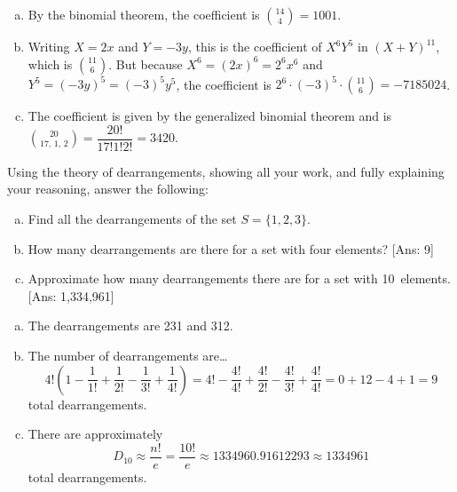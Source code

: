 \documentclass[11pt,letterpaper]{article}
\begin{document}
\sol 
\begin{enumerate}[(a)]
\item By the binomial theorem, the coefficient is $\binom{14}{4}= 1001$. 

\item Writing $X= 2x$ and $Y= -3y$, this is the coefficient of $X^6 Y^5$ in $(X + Y)^{11}$, which is $\binom{11}{6}$. But because $X^6= (2x)^6= 2^6 x^6$ and $Y^5= (-3y)^5= (-3)^5 y^5$, the coefficient is $2^6 \cdot (-3)^5 \cdot \binom{11}{6}= -7185024$. \pspace

\item The coefficient is given by the generalized binomial theorem and is $\binom{20}{17,\, 1,\, 2}= \dfrac{20!}{17! 1! 2!}= 3420$. 
\end{enumerate}



\newpage



 Using the theory of dearrangements, showing all your work, and fully explaining your reasoning, answer the following:
	\begin{enumerate}[(a)]
	\item Find all the dearrangements of the set $S= \{ 1, 2, 3 \}$. 
	\item How many dearrangements are there for a set with four elements? [Ans: 9]
	\item Approximate how many dearrangements there are for a set with 10~elements. [Ans: 1,334,961]
	\end{enumerate} \pspace

\sol 
\begin{enumerate}[(a)]
\item The dearrangements are 231 and 312. \pspace

\item The number of dearrangements are\dots
	\[
	4! \left(1 - \dfrac{1}{1!} + \dfrac{1}{2!} - \dfrac{1}{3!} + \dfrac{1}{4!} \right)= 4! - \dfrac{4!}{4!} + \dfrac{4!}{2!} - \dfrac{4!}{3!} + \dfrac{4!}{4!}= 0 + 12 - 4 + 1= 9 
	\]
total dearrangements. \pspace

\item There are approximately
	\[
	D_{10} \approx \dfrac{n!}{e}= \dfrac{10!}{e} \approx 1334960.91612293 \approx 1334961
	\]
total dearrangements. 
\end{enumerate}
\end{document}
